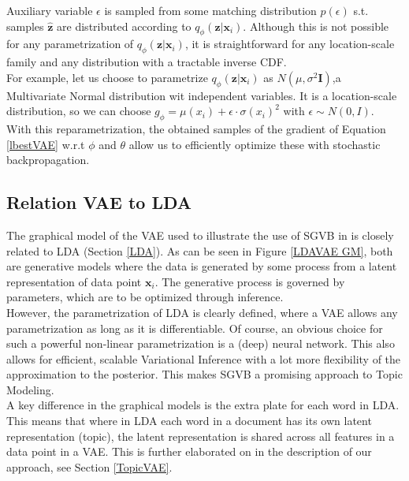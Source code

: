 \documentclass{report}
\begin{document}
Auxiliary variable $\epsilon$ is sampled from some matching distribution $p(\epsilon)$ s.t. samples $\hat{\mathbf{z}}$ are distributed according to $q_\phi(\mathbf{z}|\mathbf{x}_i)$. Although this is not possible for any parametrization of $q_\phi(\mathbf{z}|\mathbf{x}_i)$, it is straightforward for any location-scale family and any distribution with a tractable inverse CDF. \\
For example, let us choose to parametrize $q_\phi(\mathbf{z}|\mathbf{x}_i)$ as $N(\mu,\sigma^2 \mathbf{I})$,a Multivariate Normal distribution wit independent variables. It is a location-scale distribution, so we can choose $g_\phi = \mu(x_i) + \epsilon \cdot \sigma(x_i) ^2$ with $\epsilon \sim N(0,I)$. \\
With this reparametrization, the obtained samples of the gradient of Equation \ref{lbestVAE} w.r.t $\phi$ and $\theta$ allow us to efficiently optimize these with stochastic backpropagation.

\subsection{Relation VAE to LDA}\label{RelVAELDA}

The graphical model of the VAE used to illustrate the use of SGVB in \cite{kingma2013auto} is closely related to LDA \cite{blei2003latent} (Section \ref{LDA}). As can be seen in Figure \ref{LDAVAE GM}, both are generative models where the data is generated by some process from a latent representation of data point $\mathbf{x}_i$. The generative process is governed by parameters, which are to be optimized through inference. \\
However, the parametrization of LDA is clearly defined, where a VAE allows any parametrization as long as it is differentiable. Of course, an obvious choice for such a powerful non-linear parametrization is a (deep) neural network. This also allows for efficient, scalable Variational Inference with a lot more flexibility of the approximation to the posterior. This makes SGVB a promising approach to Topic Modeling.  \\ 
A key difference in the graphical models is the extra plate for each word in LDA. This means that where in LDA each word in a document has its own latent representation (topic), the latent representation is shared across all features in a data point in a VAE. This is further elaborated on in the description of our approach, see Section \ref{TopicVAE}.
\end{document}
